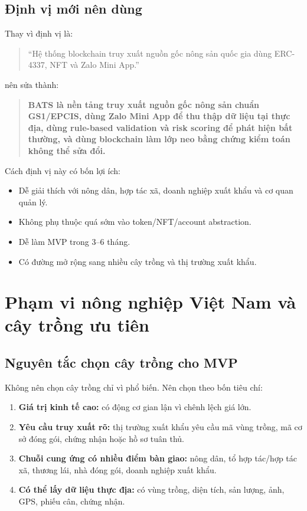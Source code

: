 \documentclass[12pt,a4paper]{article}
\begin{document}
\subsection{Định vị mới nên dùng}

Thay vì định vị là:

\begin{quote}
``Hệ thống blockchain truy xuất nguồn gốc nông sản quốc gia dùng ERC-4337, NFT và Zalo Mini App.''
\end{quote}

nên sửa thành:

\begin{quote}
\textbf{BATS là nền tảng truy xuất nguồn gốc nông sản chuẩn GS1/EPCIS, dùng Zalo Mini App để thu thập dữ liệu tại thực địa, dùng rule-based validation và risk scoring để phát hiện bất thường, và dùng blockchain làm lớp neo bằng chứng kiểm toán không thể sửa đổi.}
\end{quote}

Cách định vị này có bốn lợi ích:

\begin{itemize}[leftmargin=2em]
    \item Dễ giải thích với nông dân, hợp tác xã, doanh nghiệp xuất khẩu và cơ quan quản lý.
    \item Không phụ thuộc quá sớm vào token/NFT/account abstraction.
    \item Dễ làm MVP trong 3--6 tháng.
    \item Có đường mở rộng sang nhiều cây trồng và thị trường xuất khẩu.
\end{itemize}

\section{Phạm vi nông nghiệp Việt Nam và cây trồng ưu tiên}

\subsection{Nguyên tắc chọn cây trồng cho MVP}

Không nên chọn cây trồng chỉ vì phổ biến. Nên chọn theo bốn tiêu chí:

\begin{enumerate}[leftmargin=2em]
    \item \textbf{Giá trị kinh tế cao:} có động cơ gian lận vì chênh lệch giá lớn.
    \item \textbf{Yêu cầu truy xuất rõ:} thị trường xuất khẩu yêu cầu mã vùng trồng, mã cơ sở đóng gói, chứng nhận hoặc hồ sơ tuân thủ.
    \item \textbf{Chuỗi cung ứng có nhiều điểm bàn giao:} nông dân, tổ hợp tác/hợp tác xã, thương lái, nhà đóng gói, doanh nghiệp xuất khẩu.
    \item \textbf{Có thể lấy dữ liệu thực địa:} có vùng trồng, diện tích, sản lượng, ảnh, GPS, phiếu cân, chứng nhận.
\end{enumerate}
\end{document}
